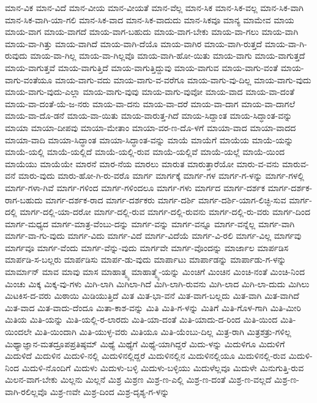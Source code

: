 {ಮಾನ-ವಿಕ
ಮಾನ-ವಿದೆ
ಮಾನ-ವೀಯ
ಮಾನ-ವೀಯತೆ
ಮಾನ-ವೆಲ್ಲ
ಮಾನ-ಸಿಕ
ಮಾನ-ಸಿಕ-ವಲ್ಲ
ಮಾನ-ಸಿಕ-ವಾಗಿ
ಮಾನ-ಸಿಕ-ವಾಗಿ-ಯಾ-ಗಲಿ
ಮಾನ-ಸಿಕ-ವಾದ
ಮಾನ-ಸಿಕ-ವಾದುದು
ಮಾನ-ಸಿಕವೂ
ಮಾನ್ಯ
ಮಾಮೇವ
ಮಾಯ
ಮಾಯ-ವಾಗ
ಮಾಯ-ವಾಗದೆ
ಮಾಯ-ವಾಗ-ಬಹುದು
ಮಾಯ-ವಾಗ-ಬೇಕು
ಮಾಯ-ವಾ-ಗಲು
ಮಾಯ-ವಾಗಿ
ಮಾಯ-ವಾ-ಗಿತ್ತು
ಮಾಯ-ವಾಗಿದೆ
ಮಾಯ-ವಾಗಿ-ದೆಯೊ
ಮಾಯ-ವಾಗಿರ
ಮಾಯ-ವಾಗಿ-ರುತ್ತದೆ
ಮಾಯ-ವಾ-ಗಿ-ರುವುದು
ಮಾಯ-ವಾ-ಗಿಲ್ಲ
ಮಾಯ-ವಾ-ಗಿಲ್ಲವೊ
ಮಾಯ-ವಾಗಿ-ಹೋ-ಯಿತು
ಮಾಯ-ವಾಗು
ಮಾಯ-ವಾಗುತ್ತದೆ
ಮಾಯ-ವಾಗುತ್ತವೆ
ಮಾಯ-ವಾಗುತ್ತಿದೆ
ಮಾಯ-ವಾಗುತ್ತಿದ್ದುವು
ಮಾಯ-ವಾಗುವ
ಮಾಯ-ವಾಗು-ವಂತೆ
ಮಾಯ-ವಾಗು-ವಂತೆಯೂ
ಮಾಯ-ವಾಗು-ವದು
ಮಾಯ-ವಾಗು-ವ-ವರೆಗೂ
ಮಾಯ-ವಾಗು-ವು-ದಿಲ್ಲ
ಮಾಯ-ವಾಗು-ವುದು
ಮಾಯ-ವಾಗು-ವುದು-ಎಲ್ಲಾ
ಮಾಯ-ವಾಗು-ವುವು
ಮಾಯ-ವಾಗು-ವುವೋ
ಮಾಯ-ವಾದ
ಮಾಯ-ವಾ-ದಂತೆ
ಮಾಯ-ವಾ-ದಂತೆ-ಯೆ-ಜ-ನರು
ಮಾಯ-ವಾ-ದನು
ಮಾಯ-ವಾ-ದರೆ
ಮಾಯ-ವಾ-ದಾಗ
ಮಾಯ-ವಾ-ದಾಗಲೆ
ಮಾಯ-ವಾ-ದೊ-ಡನೆ
ಮಾಯ-ವಾ-ಯಿತು
ಮಾಯ-ವಾರುತ್ತ-ಗಿದೆ
ಮಾಯ-ಸಿದ್ದಾಂತ
ಮಾಯ-ಸಿದ್ಧಾಂತ-ವನ್ನು
ಮಾಯಾ
ಮಾಯಾ-ದೀಪವು
ಮಾಯಾ-ಮೇತಾಂ
ಮಾಯಾ-ವರ-ಣ-ದೊ-ಳಗೆ
ಮಾಯಾ-ವಾದ
ಮಾಯಾ-ವಾದದ
ಮಾಯಾ-ವಾದಿ
ಮಾಯಾ-ಸಿದ್ಧಾಂತ
ಮಾಯಾ-ಸಿದ್ಧಾಂತ-ವನ್ನು
ಮಾಯೆ
ಮಾಯೆಗೆ
ಮಾಯೆಯ
ಮಾಯೆ-ಯನ್ನು
ಮಾಯೆ-ಯಲ್ಲಿ
ಮಾಯೆ-ಯಲ್ಲಿದೆ
ಮಾಯೆ-ಯಲ್ಲಿ-ರುವ
ಮಾಯೆ-ಯಲ್ಲಿವೆ
ಮಾಯೆ-ಯಲ್ಲೆ
ಮಾಯೆ-ಯಿಂದ
ಮಾಯೆಯು
ಮಾಯೆಯೇ
ಮಾರನೆ
ಮಾರ-ನೆಯ
ಮಾರಲು
ಮಾರುತ
ಮಾರುತ್ತಾರೆಯೋ
ಮಾರು-ವ-ವನು
ಮಾರುವ-ವನೆ
ಮಾರು-ವುದು
ಮಾರು-ಹೋ-ಗಿ-ರು-ವರೊ
ಮಾರ್ಗ
ಮಾರ್ಗಕ್ಕೆ
ಮಾರ್ಗ-ಗಳ
ಮಾರ್ಗ-ಗ-ಳನ್ನು
ಮಾರ್ಗ-ಗಳಲ್ಲಿ
ಮಾರ್ಗ-ಗಳಾ-ಗಿವೆ
ಮಾರ್ಗ-ಗಳಿಂದ
ಮಾರ್ಗ-ಗಳಿಂದಲೂ
ಮಾರ್ಗ-ಗಳು
ಮಾರ್ಗದ
ಮಾರ್ಗ-ದರ್ಶಕ
ಮಾರ್ಗ-ದರ್ಶಕ-ರಾಗ-ಬಹುದು
ಮಾರ್ಗ-ದರ್ಶಕ-ರಾದ
ಮಾರ್ಗ-ದರ್ಶಕರು
ಮಾರ್ಗ-ದರ್ಶಿ
ಮಾರ್ಗ-ದರ್ಶಿ-ಯಾಗ-ಲಿಚ್ಛಿ-ಸುವ
ಮಾರ್ಗ-ದಲ್ಲಿ
ಮಾರ್ಗ-ದಲ್ಲಿ-ಯಾ-ದರೋ
ಮಾರ್ಗ-ದಲ್ಲಿ-ರುವ
ಮಾರ್ಗ-ದಲ್ಲಿ-ರುವನು
ಮಾರ್ಗ-ದಲ್ಲಿ-ರು-ವರು
ಮಾರ್ಗ-ದಿಂದ
ಮಾರ್ಗ-ಮಧ್ಯದ
ಮಾರ್ಗ-ಮಾತ್ರ-ವೆಂಬು-ದನ್ನು
ಮಾರ್ಗ-ವನ್ನು
ಮಾರ್ಗ-ವನ್ನೂ
ಮಾರ್ಗ-ವನ್ನೆಲ್ಲ
ಮಾರ್ಗ-ವಾಗಿ
ಮಾರ್ಗ-ವಾ-ಗು-ವುದು
ಮಾರ್ಗ-ವಿದು
ಮಾರ್ಗ-ವಿದೆ
ಮಾರ್ಗ-ವಿದೆಯೆ
ಮಾರ್ಗ-ವಿ-ರಲಿ
ಮಾರ್ಗ-ವಿಲ್ಲ
ಮಾರ್ಗವು
ಮಾರ್ಗವೂ
ಮಾರ್ಗ-ವೆಂದು
ಮಾರ್ಗ-ವೆನ್ನು-ವುದು
ಮಾರ್ಗವೇ
ಮಾರ್ಗ-ವೊಂದನ್ನು
ಮಾರ್ಜಾಲ
ಮಾರ್ಪಡಿಸ
ಮಾರ್ಪಡಿ-ಸ-ಬಲ್ಲರು
ಮಾರ್ಪಡಿಸು
ಮಾರ್ಪ-ಡು-ವುದು
ಮಾರ್ಪಾಟು
ಮಾರ್ಪಾಡನ್ನು
ಮಾರ್ಪಾಡು-ಗ-ಳನ್ನು
ಮಾರ್ಮಾನ್
ಮಾವ
ಮಾವು
ಮಾಸ
ಮಾಹಾತ್ಮ್ಯ
ಮಾಹಾತ್ಮ್ಯೆ-ಯನ್ನು
ಮಿಂಚಿಗೆ
ಮಿಂಚಿನ
ಮಿಂಚಿ-ನಂತೆ
ಮಿಂಚಿ-ನಿಂದ
ಮಿಂಚು
ಮಿಕ್ಕ
ಮಿಕ್ಕ-ವು-ಗಳು
ಮಿಗಿ-ಲಾಗಿ
ಮಿಗಿಲಾ-ಗಿದೆ
ಮಿಗಿ-ಲಾಗಿ-ರುವನು
ಮಿಗಿ-ಲಾದ
ಮಿಗಿ-ಲಾ-ದುದು
ಮಿಗಿಲು
ಮಿಟಕಿಸ-ದ-ವರು
ಮಿಠಾಯಿ
ಮಿಡಿಯುತ್ತಿದೆ
ಮಿತ
ಮಿತ-ಭಾ-ವನೆ
ಮಿತ-ವಾಗ-ಬಲ್ಲದು
ಮಿತ-ವಾಗಿ
ಮಿತ-ವಾಗಿದೆ
ಮಿತ-ವಾದ
ಮಿತ-ವಾದು-ದೆಂದೂ
ಮಿತಾ-ಕಾಶ-ವನ್ನು
ಮಿತಿ
ಮಿತಿ-ಗ-ಳನ್ನು
ಮಿತಿಗೆ
ಮಿತಿ-ಗೊಳ-ಗಾಗಿ
ಮಿತಿ-ಮೀರಿ
ಮಿತಿಯ
ಮಿತಿ-ಯನ್ನು
ಮಿತಿ-ಯಲ್ಲಿ-ರ-ಲಾರದು
ಮಿತಿ-ಯಾ-ದಂತೆ
ಮಿತಿ-ಯಾದು-ದ-ರಿಂದ
ಮಿತಿ-ಯಿಂದ
ಮಿತಿ-ಯಿಂದಲೇ
ಮಿತಿ-ಯಿಂದಾಗಿ
ಮಿತಿ-ಯುಳ್ಳ-ವರು
ಮಿತಿಯೂ
ಮಿತಿ-ಯೆಂಬು-ದಿಲ್ಲ
ಮಿತ್ರ-ರಾಗಿ
ಮಿತ್ರಶತ್ರು-ಗಳಿಲ್ಲ
ಮಿಥ್ಯಾಜ್ಞಾನ-ಮತದ್ರೂಪಪ್ರತಿಷ್ಠಮ್
ಮಿಥ್ಯೆ
ಮಿಥ್ಯೆಗೆ
ಮಿಥ್ಯೆ-ಯಾಗಿದ್ದರೆ
ಮಿದು-ಳನ್ನು
ಮಿದುಳಿಗೂ
ಮಿದುಳಿಗೆ
ಮಿದುಳಿದೆ
ಮಿದುಳಿನ
ಮಿದುಳಿ-ನಲ್ಲಿ
ಮಿದುಳಿನಲ್ಲಿದ್ದರೆ
ಮಿದುಳಿನಲ್ಲಿನ
ಮಿದುಳಿನಲ್ಲಿಯೂ
ಮಿದುಳಿನಲ್ಲಿ-ರುವ
ಮಿದುಳಿ-ನಿಂದ
ಮಿದುಳಿ-ನೊಂದಿಗೆ
ಮಿದುಳು
ಮಿದುಳು-ಬಳ್ಳಿ
ಮಿದುಳು-ಬಳ್ಳಿಯು
ಮಿದುಳೆಲ್ಲವೂ
ಮಿದುಳೇ
ಮಿನುಗುತ್ತಿ-ರುವ
ಮಿಲನ-ವಾಗ-ಬೇಕು
ಮಿಲ್ಲನು
ಮಿಲ್ಲನೆ
ಮಿಶ್ರ
ಮಿಶ್ರಣ
ಮಿಶ್ರ-ಣ-ಎಲ್ಲಿ
ಮಿಶ್ರ-ಣ-ದಂತೆ
ಮಿಶ್ರ-ಣ-ವಲ್ಲದೆ
ಮಿಶ್ರ-ಣ-ವಾಗಿ-ರಲಿಲ್ಲವೊ
ಮಿಶ್ರ-ಣವೇ
ಮಿಶ್ರ-ದಿಂದ
ಮಿಶ್ರ-ದೃಶ್ಯ-ಗ-ಳನ್ನು
}

